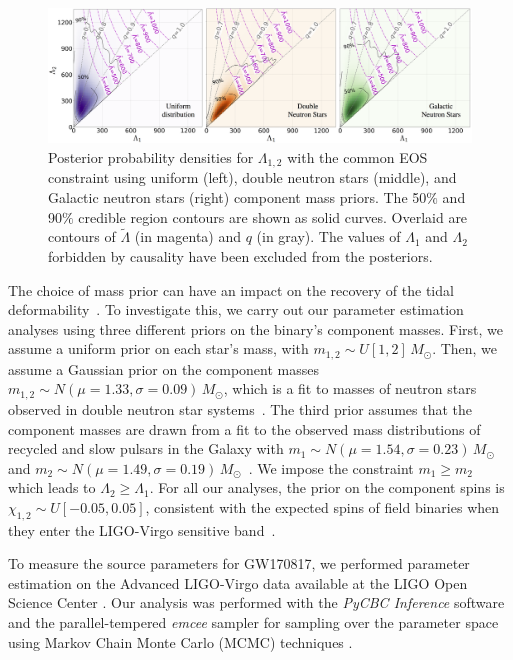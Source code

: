 \begin{figure}[t]
  \includegraphics[width=\textwidth]{Figures/common-radius/Lambda1_2_contours_no1D_w_q_moreiter.png}
  \caption{Posterior probability densities for $\Lambda_{1,2}$ with the common EOS constraint using uniform (left), double neutron stars (middle), and Galactic neutron stars (right) component mass priors. The 50$\%$ and 90$\%$ credible region contours are shown as solid curves. Overlaid are contours of $\tilde{\Lambda}$ (in magenta) and $q$ (in gray). The values of $\Lambda_1$ and $\Lambda_2$ forbidden by causality have been excluded from the posteriors.
\label{fig:lamb12_1abc}
%
}
\end{figure}
The choice of mass prior can have an impact on the recovery of the tidal deformability~\cite{Agathos:2015uaa}. To investigate this, we carry out our parameter estimation analyses using three different priors on the binary's component masses. First, we assume a uniform prior on each star's mass, with $m_{1,2} \sim U[1,2]\, M_\odot$. Then, we assume a Gaussian prior on the component masses $m_{1,2} \sim N(\mu = 1.33, \sigma = 0.09)\, M_\odot$, which is a fit to masses of neutron stars observed in  double neutron star systems~\cite{Ozel:2016oaf}. The third prior assumes that the component masses are drawn from a fit to the observed mass distributions of recycled and slow pulsars in the Galaxy with $m_1 \sim N(\mu = 1.54, \sigma = 0.23)\, M_\odot$ and $m_2 \sim N(\mu = 1.49, \sigma = 0.19)\, M_\odot$~\cite{Ozel:2016oaf}. We impose the constraint $m_1 \geq m_2$ which leads to $\Lambda_2 \geq \Lambda_1$. For all our analyses, the prior on the component spins is $\chi_{1,2} \sim U[-0.05,0.05]$, consistent with the expected spins of field binaries when they enter the LIGO-Virgo sensitive band~\cite{Brown:2012qf}.

To measure the source parameters for GW170817, we performed parameter estimation on the Advanced LIGO-Virgo data available at the LIGO Open Science Center \cite{Vallisneri:2014vxa,gw170817-losc}. 
Our analysis was performed with the \textit{PyCBC Inference} software \cite{Biwer:2018osg,alex_nitz_2018_1208115} and the parallel-tempered \textit{emcee} sampler \cite{emcee,vousden:2016} for sampling over the parameter space using Markov Chain Monte Carlo (MCMC) techniques \cite{mcmc}. 

